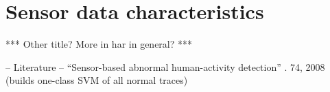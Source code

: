 \section{Sensor data characteristics}\label{sec:sensor_data_characteristics}
*** Other title? More in \acrlong{har} in general? ***

-- Literature --
``Sensor-based abnormal human-activity detection'' \cite{yin2008sensor}. 74, 2008 (builds one-class SVM of all normal traces) \\